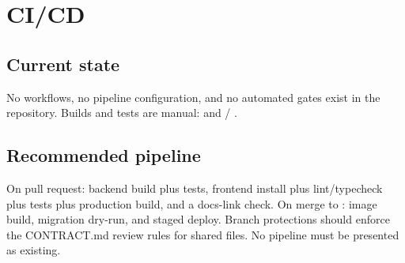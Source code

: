 \section{CI/CD}
\label{sec:cicd}

\subsection{Current state}

No  workflows, no pipeline configuration, and no automated gates exist in the repository. Builds and tests are manual:  and  / .

\subsection{Recommended pipeline}

On pull request: backend build plus tests, frontend install plus lint/typecheck plus tests plus production build, and a docs-link check. On merge to : image build, migration dry-run, and staged deploy. Branch protections should enforce the CONTRACT.md review rules for shared files. No pipeline must be presented as existing.

